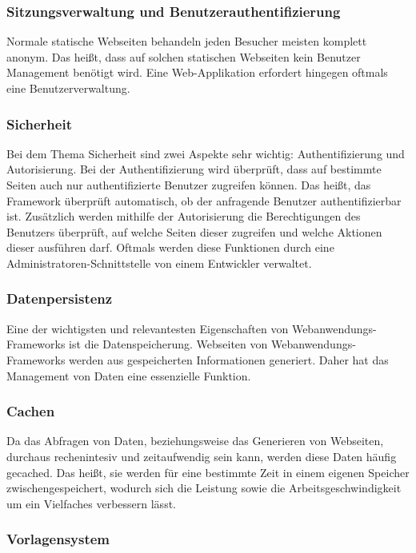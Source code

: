 \subsubsection{Sitzungsverwaltung und Benutzerauthentifizierung}

Normale statische Webseiten behandeln jeden Besucher meisten komplett anonym. Das heißt, dass auf solchen statischen Webseiten kein Benutzer Management benötigt wird. Eine Web-Applikation erfordert hingegen oftmals eine Benutzerverwaltung. 

\subsubsection{Sicherheit}

Bei dem Thema Sicherheit sind zwei Aspekte sehr wichtig: Authentifizierung und Autorisierung. Bei der Authentifizierung wird überprüft, dass auf bestimmte Seiten auch nur authentifizierte Benutzer zugreifen können. Das heißt, das Framework überprüft automatisch, ob der anfragende Benutzer authentifizierbar ist. Zusätzlich werden mithilfe der Autorisierung die Berechtigungen des Benutzers überprüft, auf welche Seiten dieser zugreifen und welche Aktionen dieser ausführen darf. Oftmals werden diese Funktionen durch eine Administratoren-Schnittstelle von einem Entwickler verwaltet.

\subsubsection{Datenpersistenz}

Eine der wichtigsten und relevantesten Eigenschaften von Webanwendungs-Frameworks ist die Datenspeicherung. Webseiten von Webanwendungs-Frameworks werden aus gespeicherten Informationen generiert. Daher hat das Management von Daten eine essenzielle Funktion.

\subsubsection{Cachen}

Da das Abfragen von Daten, beziehungsweise das Generieren von Webseiten, durchaus rechenintesiv und zeitaufwendig sein kann, werden diese Daten häufig gecached. Das heißt, sie werden für eine bestimmte Zeit in einem eigenen Speicher zwischengespeichert, wodurch sich die Leistung sowie die Arbeitsgeschwindigkeit um ein Vielfaches verbessern lässt.

\subsubsection{Vorlagensystem}

